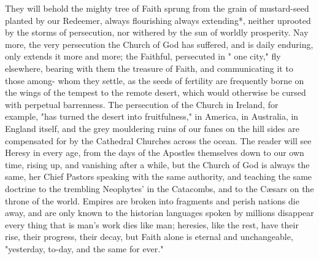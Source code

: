\documentclass[12pt]{book}
\begin{document}
They will behold the mighty tree of Faith sprung from the grain of mustard-seed planted by our
Redeemer, always flourishing always extending*, neither uprooted by the storms of persecution, nor
withered by the sun of worldly prosperity. Nay more, the very persecution the Church of God has
suffered, and is daily enduring, only extends it more and more; the Faithful, persecuted in " one city," fly
elsewhere, bearing with them the treasure of Faith, and communicating it to those among- whom they
settle, as the seeds of fertility are frequently borne on the wings of the tempest to the remote desert,
which would otherwise be cursed with perpetual barrenness. The persecution of the Church in Ireland,
for example, "has turned the desert into fruitfulness," in America, in Australia, in England itself, and the
grey mouldering ruins of our fanes on the hill sides are compensated for by the Cathedral Churches
across the ocean. The reader will see Heresy in every age, from the days of the Apostles themselves down
to our own time, rising up, and vanishing after a while, but the Church of God is always the same, her
Chief Pastors speaking with the same authority, and teaching the same doctrine to the trembling
Neophytes’ in the Catacombs, and to the Cæsars on the throne of the world. Empires are broken into
fragments and perish nations die away, and are only known to the historian languages spoken by
millions disappear every thing that is man’s work dies like man; heresies, like the rest, have their rise,
their progress, their decay, but Faith alone is eternal and unchangeable, "yesterday, to-day, and the same
for ever."
\end{document}
